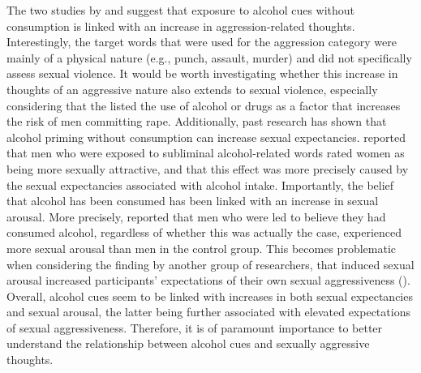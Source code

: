 \documentclass[serif, twocolumn, numeric, empirical]{jote-article}
\begin{document}
The two studies by \textcite{BartholowHeinz2006} and \textcite{SubraMullerBegueLBushmanDelmas2010} suggest that exposure to alcohol cues without consumption is linked with an increase in aggression-related thoughts. Interestingly, the target words that were used for the aggression category were mainly of a physical nature (e.g., punch, assault, murder) and did not specifically assess sexual violence. It would be worth investigating whether this increase in thoughts of an aggressive nature also extends to sexual violence, especially considering that the \textcite{WHOSex} listed the use of alcohol or drugs as a factor that increases the risk of men committing rape. Additionally, past research has shown that alcohol priming without consumption can increase sexual expectancies. \textcite{FriedmanMcCarthyForsterJDenzler2005} reported that men who were exposed to subliminal alcohol-related words rated women as being more sexually attractive, and that this effect was more precisely caused by the sexual expectancies associated with alcohol intake. Importantly, the belief that alcohol has been consumed has been linked with an increase in sexual arousal. More precisely, \textcite{AbbeyMcAuslanZawackiClintonBuck2001} reported that men who were led to believe they had consumed alcohol, regardless of whether this was actually the case, experienced more sexual arousal than men in the control group. This becomes problematic when considering the finding by another group of researchers, that induced sexual arousal increased participants’ expectations of their own sexual aggressiveness (\cite{LoewensteinNaginPaternoster1997}). Overall, alcohol cues seem to be linked with increases in both sexual expectancies and sexual arousal, the latter being further associated with elevated expectations of sexual aggressiveness. Therefore, it is of paramount importance to better understand the relationship between alcohol cues and sexually aggressive thoughts.
\end{document}
